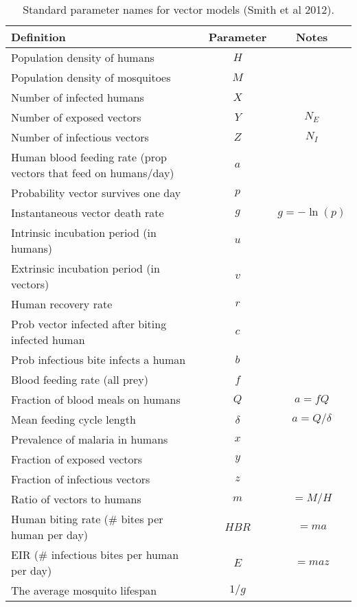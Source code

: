 \documentclass[a4paper,12pt]{article}
\begin{document}
\begin{table*}[h]
\caption{Standard parameter names for vector models (Smith et al 2012).}%
\vspace{.1cm}
\centering %
\begin{tabular}{l c c}%
\hline\hline                        %
Definition & Parameter & Notes \\ [0.5ex]%
\hline                  %
Population density of humans & $H$ &  \\
Population density of mosquitoes & $M$ &  \\
Number of infected humans & $X$ &  \\
Number of exposed vectors & $Y$ & $N_E$ \\
Number of infectious vectors & $Z$ & $N_I$ \\
Human blood feeding rate (prop vectors that feed on humans/day) & $a$ & \\
Probability vector survives one day & $p$ & \\
Instantaneous vector death rate & $g$ & $g=-\ln(p)$  \\
Intrinsic incubation period (in humans) & $u$ & \\
Extrinsic incubation period (in vectors) & $v$ & \\
Human recovery rate & $r$ & \\
Prob vector infected after biting infected human & $c$ & \\
Prob infectious bite infects a human & $b$ & \\
Blood feeding rate (all prey) & $f$ & \\
Fraction of blood meals on humans & $Q$ & $a=fQ$ \\
Mean feeding cycle length & $\delta$ & $a=Q/\delta$\\
Prevalence of malaria in humans & $x$ & \\
Fraction of exposed vectors & $y$ & \\
Fraction of infectious vectors & $z$ & \\
Ratio of vectors to humans & $m$ & $=M/H$ \\
Human biting rate (\# bites per human per day) & $HBR$ & $=ma$\\
EIR (\# infectious bites per human per day) & $E$ & $=maz$ \\
The average mosquito lifespan & $1/g$ & \\

\end{tabular}
\end{table*}
\end{document}
